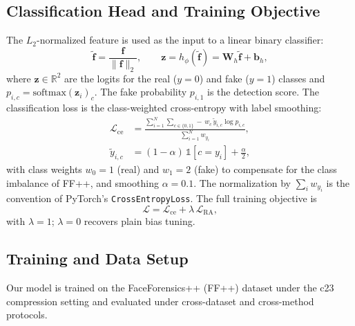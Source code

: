 \documentclass[fonts]{icst}
\begin{document}
\subsection{Classification Head and Training Objective}

The $L_2$-normalized feature is used as the input to a linear binary classifier:
\begin{equation}
\tilde{\mathbf{f}} = \frac{\mathbf{f}}{\lVert \mathbf{f} \rVert_2}, \qquad
\mathbf{z} = h_{\phi}(\tilde{\mathbf{f}}) = \mathbf{W}_h\tilde{\mathbf{f}}+\mathbf{b}_h,
\end{equation}
where $\mathbf{z} \in \mathbb{R}^2$ are the logits for the real ($y=0$) and fake ($y=1$) classes and $p_{i,c}=\mathrm{softmax}(\mathbf{z}_i)_c$. The fake probability $p_{i,1}$ is the detection score.
The classification loss is the class-weighted cross-entropy with label smoothing:
\begin{equation}
\begin{aligned}
\mathcal{L}_{\mathrm{ce}}&=\frac{\sum_{i=1}^{N}\sum_{c\in\{0,1\}}-\,w_c\,\tilde{y}_{i,c}\log p_{i,c}}{\sum_{i=1}^{N}w_{y_i}},\\
\tilde{y}_{i,c}&=(1-\alpha)\,\mathbb{1}[c=y_i]+\tfrac{\alpha}{2},
\end{aligned}
\label{eq:ce}
\end{equation}
with class weights $w_0=1$ (real) and $w_1=2$ (fake) to compensate for the class imbalance of FF++, and smoothing $\alpha=0.1$. The normalization by $\sum_i w_{y_i}$ is the convention of PyTorch's \texttt{CrossEntropyLoss}.
The full training objective is
\begin{equation}
\mathcal{L}=\mathcal{L}_{\mathrm{ce}}+\lambda\,\mathcal{L}_{\mathrm{RA}},
\label{eq:total}
\end{equation}
with $\lambda=1$; $\lambda=0$ recovers plain bias tuning.

\subsection{Training and Data Setup}
\label{sec:impl}

Our model is trained on the FaceForensics++ (FF++) dataset under the c23 compression setting and evaluated under cross-dataset and cross-method protocols.
\end{document}
